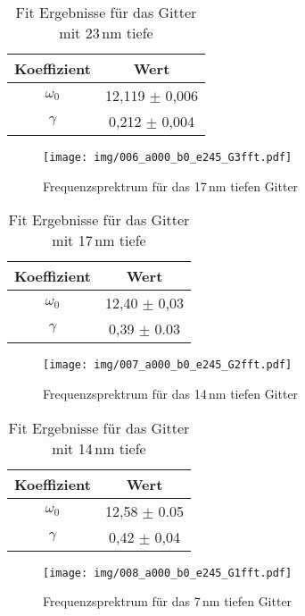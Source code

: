 \begin{table}[!htbp]
 \centering
\begin{tabular}{cc}
    Koeffizient & Wert \\
	\midrule
 	$\omega_0$ & 12,119 $\pm$ 0,006 \\
 	$\gamma$ & 0,212 $\pm$ 0,004 \\
\end{tabular}
\caption{Fit Ergebnisse für das Gitter mit 23\,nm tiefe}
\label{tab:fit}
\end{table}


\begin{figure}[!htbp]
 	\centering
 	\texttt{[image: img/006\_a000\_b0\_e245\_G3fft.pdf]}
 	\caption{Frequenzsprektrum für das 17\,nm tiefen Gitter}
 	\label{abb:film}
\end{figure}

\begin{table}[!htbp]
 \centering
\begin{tabular}{cc}
    Koeffizient & Wert \\
	\midrule
 	$\omega_0$ & 12,40 $\pm$ 0,03 \\
 	$\gamma$ & 0,39 $\pm$ 0.03 \\
\end{tabular}
\caption{Fit Ergebnisse für das Gitter mit 17\,nm tiefe}
\label{tab:fit}
\end{table}

\begin{figure}[!htbp]
 	\centering
 	\texttt{[image: img/007\_a000\_b0\_e245\_G2fft.pdf]}
 	\caption{Frequenzsprektrum für das 14\,nm tiefen Gitter}
 	\label{abb:film}
\end{figure}

\begin{table}[!htbp]
 \centering
\begin{tabular}{cc}
    Koeffizient & Wert \\
	\midrule
 	$\omega_0$ & 12,58 $\pm$ 0.05 \\
 	$\gamma$ & 0,42 $\pm$ 0,04 \\
\end{tabular}
\caption{Fit Ergebnisse für das Gitter mit 14\,nm tiefe}
\label{tab:fit}
\end{table}

\begin{figure}[!htbp]
 	\centering
 	\texttt{[image: img/008\_a000\_b0\_e245\_G1fft.pdf]}
 	\caption{Frequenzsprektrum für das 7\,nm tiefen Gitter}
 	\label{abb:film}
\end{figure}

